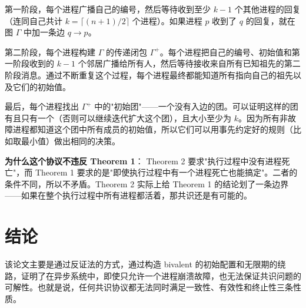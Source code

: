 \documentclass[12pt, a4paper]{ctexart}
\theoremstyle{definition}
\theoremstyle{plain}
\theoremstyle{remark}
\begin{document}
第一阶段，每个进程广播自己的编号，然后等待收到至少 $k-1$ 个其他进程的回复（连同自己共计 $k = \lceil (n+1)/2 \rceil$ 个进程）。如果进程 $p$ 收到了 $q$ 的回复，就在图 $\Gamma$ 中加一条边 $q \to p$。

第二阶段，每个进程构建 $\Gamma$ 的传递闭包 $\Gamma^+$。每个进程把自己的编号、初始值和第一阶段收到的 $k-1$ 个邻居广播给所有人，然后等待接收来自所有已知祖先的第二阶段消息。通过不断重复这个过程，每个进程最终都能知道所有指向自己的祖先以及它们的初始值。

最后，每个进程找出 $\Gamma^+$ 中的"初始团"——一个没有入边的团。可以证明这样的团有且只有一个（否则可以继续迭代扩大这个团），且大小至少为 $k$。因为所有非故障进程都知道这个团中所有成员的初始值，所以它们可以用事先约定好的规则（比如取最小值）做出相同的决策。

\textbf{为什么这个协议不违反 Theorem 1}：
Theorem 2 要求"执行过程中没有进程死亡"，而 Theorem 1 要求的是"即使执行过程中有一个进程死亡也能搞定"。二者的条件不同，所以不矛盾。Theorem 2 实际上给 Theorem 1 的结论划了一条边界——如果在整个执行过程中所有进程都活着，那共识还是有可能的。


\section{结论}

该论文主要是通过反证法的方式，通过构造 bivalent 的初始配置和无限期的绕路，证明了在异步系统中，即使只允许一个进程崩溃故障，也无法保证共识问题的可解性。也就是说，任何共识协议都无法同时满足一致性、有效性和终止性三条性质。
\end{document}
